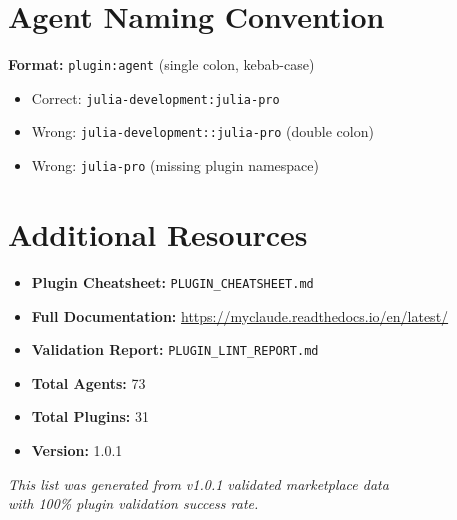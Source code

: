 \documentclass[11pt,a4paper]{article}
\begin{document}
\section{Agent Naming Convention}

\begin{tcolorbox}[colback=tableheader,colframe=primarycolor,arc=2mm]
\textbf{Format:} \texttt{plugin:agent} (single colon, kebab-case)

\begin{itemize}[leftmargin=2cm]
    \item[\color{green}\Large\checkmark] Correct: \texttt{julia-development:julia-pro}
    \item[\color{red}\Large\ding{55}] Wrong: \texttt{julia-development::julia-pro} (double colon)
    \item[\color{red}\Large\ding{55}] Wrong: \texttt{julia-pro} (missing plugin namespace)
\end{itemize}
\end{tcolorbox}

\section{Additional Resources}

\begin{itemize}
    \item \textbf{Plugin Cheatsheet:} \texttt{PLUGIN\_CHEATSHEET.md}
    \item \textbf{Full Documentation:} \url{https://myclaude.readthedocs.io/en/latest/}
    \item \textbf{Validation Report:} \texttt{PLUGIN\_LINT\_REPORT.md}
    \item \textbf{Total Agents:} 73
    \item \textbf{Total Plugins:} 31
    \item \textbf{Version:} 1.0.1
\end{itemize}

\vfill

\begin{center}
\small\color{secondarycolor}
\textit{This list was generated from v1.0.1 validated marketplace data\\
with 100\% plugin validation success rate.}
\end{center}
\end{document}
